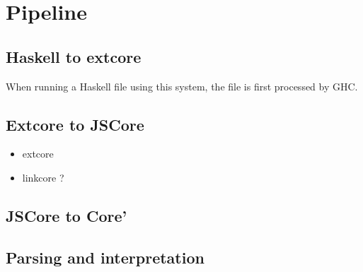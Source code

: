 

\section{Pipeline}
\label{chap:pipe}

\subsection{Haskell to extcore}

When running a Haskell file using this system, the file is first processed
by GHC.

\subsection{Extcore to JSCore}

\begin{itemize}
\item extcore
\item linkcore ?
\end{itemize}

\subsection{JSCore to Core'}

\subsection{Parsing and interpretation}

